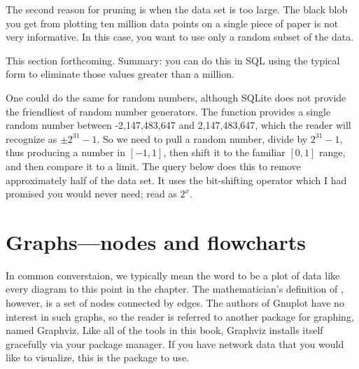The second reason for pruning is when the data set is too large. The black
blob you get from plotting ten million data points on a single piece of
paper is not very informative. In this case, you want to use only a
random subset of the data.

This section forthcoming. Summary: you can do this in SQL using the
typical  form to eliminate
those values greater than a million. 

One could do the same for random
numbers, although SQLite does not provide the friendliest of random
number generators. The  function provides a single random
number between -2,147,483,647 and 2,147,483,647, which the reader will
recognize as $\pm 2^{31}-1$. So we need to pull a random number,
divide by $2^{31}-1$, thus producing a number in $[-1,1]$, then shift it
to the familiar $[0,1]$ range, and then compare it to a limit. The
query below does this to remove approximately half of the data set.
It uses the bit-shifting operator which I had promised you would never
need; read  as $2^x$.




\section{\treesymbol Graphs---nodes and flowcharts} In common converstaion, we
typically mean the word  to be a plot of data like every
diagram to this point in the chapter. The mathematician's definition
of , however, is a set of nodes connected by edges. The
authors of Gnuplot have no interest in such graphs, so the reader is
referred to another package for graphing, named Graphviz. Like
all of the tools in this book, Graphviz installs itself
gracefully via your package manager. If you have network data that you
would like to visualize, this is the package to use.

